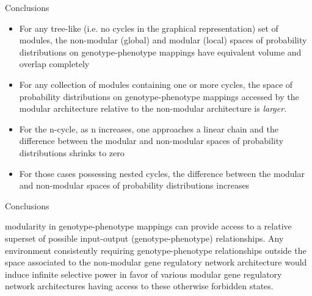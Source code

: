 \begin{frame}
\begin{block}{Conclusions}
\begin{small}
\begin{itemize}
\item For any tree-like (i.e. no cycles in the graphical representation) set of modules, the non-modular (global) and modular (local) spaces of probability distributions on genotype-phenotype mappings have equivalent volume and overlap completely
\item For any collection of modules containing one or more cycles, the space of probability distributions on genotype-phenotype mappings accessed by the modular architecture relative to the non-modular architecture is \emph{larger}.
\item For the n-cycle, as n increases, one approaches a linear chain and the difference between the modular and non-modular spaces of probability distributions shrinks to zero
\item For those cases possessing nested cycles, the difference between the modular and non-modular spaces of probability distributions increases
\end{itemize}
\end{small}
\end{block}
\end{frame}

\begin{frame}
\begin{block}{Conclusions}
\begin{small}
modularity in genotype-phenotype mappings can provide access to a relative superset of possible input-output (genotype-phenotype) relationships. Any environment consistently requiring genotype-phenotype relationships outside the space associated to the non-modular gene regulatory network architecture would induce infinite selective power in favor of various modular gene regulatory network architectures having access to these otherwise forbidden states.
\end{small}
\end{block}
\end{frame}
